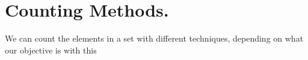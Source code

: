 \documentclass[11pt,fleqn]{book} %
\begin{document}
\chapter{Counting Methods.}

We can count the elements in a set with different techniques, depending on what our objective is with this 








\end{document}
